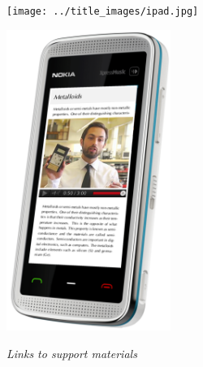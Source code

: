 \begin{center}
\begin{minipage}{0.4\textwidth}
\centering
\texttt{[image: ../title\_images/ipad.jpg]}
\end{minipage}
\begin{minipage}{0.4\textwidth}
\centering
\includegraphics[width=0.4\textwidth]{../title_images/phone.png}
\end{minipage}
\end{center}

\vspace*{2cm}


{\normalfont\sffamily\fontsize{22}\normalfont\itshape Links to support materials} \par

